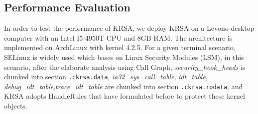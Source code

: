 \documentclass[conference]{IEEEtran}
\begin{document}
\subsection{Performance Evaluation}
In order to test the performance of KRSA, we deploy KRSA on a Levono desktop computer with an Intel I5-4950T CPU and 8GB RAM. 
The architecture is implemented on ArchLinux with kernel 4.2.5. For a given terminal scenario, SELinux is widely used which bases on Linux Security Modules (LSM), in this scenario, after the elaborate analysis using Call Graph,  \textit{security\_hook\_heads} is chunked into section \verb|.ckrsa.data|, \textit{ia32\_sys\_call\_table}, \textit{idt\_table}, \textit{debug\_idt\_table},\newline\textit{trace\_idt\_table} are chunked into section \verb|.ckrsa.rodata|, and KRSA adopts HandleRules that have formulated before to protect these kernel objects. 
\end{document}

